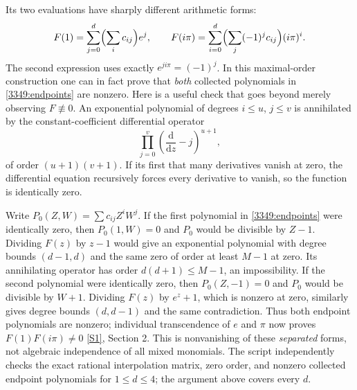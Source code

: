 \documentclass[11pt,a4paper]{article}
\newcommand{\sref}[2]{\hyperlink{source:#1:#2}{[S#2]}}
\numberwithin{equation}{section}
\begin{document}
Its two evaluations have sharply different arithmetic forms:
\begin{equation}\label{3349:endpoints}
 F(1)=\sum_{j=0}^d\Bigl(\sum_i c_{ij}\Bigr)e^j,
 \qquad
 F(i\pi)=\sum_{i=0}^d\Bigl(\sum_j(-1)^jc_{ij}\Bigr)(i\pi)^i.
\end{equation}
The second expression uses exactly $e^{ji\pi}=(-1)^j$. In this
maximal-order construction one can in fact prove that \emph{both}
collected polynomials in \eqref{3349:endpoints} are nonzero. Here is a
useful check that goes beyond merely observing $F\not\equiv0$.
An exponential polynomial of degrees $i\le u$, $j\le v$ is annihilated
by the constant-coefficient differential operator
\begin{equation}
 \prod_{j=0}^v\left(\frac{\mathrm d}{\mathrm dz}-j\right)^{u+1},
\end{equation}
of order $(u+1)(v+1)$. If its first that many derivatives vanish at
zero, the differential equation recursively forces every derivative
to vanish, so the function is identically zero.

Write $P_0(Z,W)=\sum c_{ij}Z^iW^j$. If the first polynomial in
\eqref{3349:endpoints} were identically zero, then $P_0(1,W)=0$ and
$P_0$ would be divisible by $Z-1$. Dividing $F(z)$ by $z-1$ would give
an exponential polynomial with degree bounds $(d-1,d)$ and the same
zero of order at least $M-1$ at zero. Its annihilating operator has
order $d(d+1)\le M-1$, an impossibility. If the second polynomial were
identically zero, then $P_0(Z,-1)=0$ and $P_0$ would be divisible by
$W+1$. Dividing $F(z)$ by $e^z+1$, which is nonzero at zero, similarly
gives degree bounds $(d,d-1)$ and the same contradiction. Thus both
endpoint polynomials are nonzero; individual transcendence of $e$ and
$\pi$ now proves $F(1)F(i\pi)\ne0$ \sref{3349}{1}, Section 2.
This is nonvanishing of these \emph{separated} forms, not algebraic
independence of all mixed monomials. The script independently checks
the exact rational interpolation matrix, zero order, and nonzero
collected endpoint polynomials for $1\le d\le4$; the argument above
covers every $d$.
\end{document}

